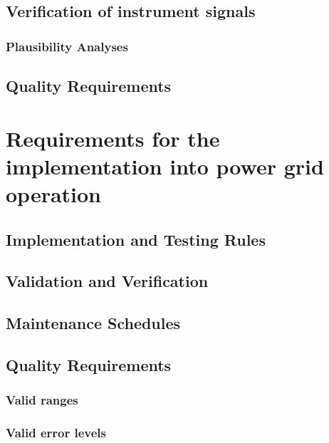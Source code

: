         \subsection{Verification of instrument signals }
    
        \subsubsection{Plausibility Analyses}\label{sec:plausibilityanalaysis}

        \subsection{Quality Requirements }\label{sec:data_quality_instruments} 

\section{Requirements for the implementation into power grid operation {\color{magenta}{Contributing author: COM}}}
    
    \subsection{Implementation and Testing Rules }
    
    \subsection{Validation and Verification }
    
    \subsection{Maintenance Schedules }

    \subsection{Quality Requirements }\label{sec:data_quality_grid}
        \subsubsection{Valid ranges }\label{subsubsec:validranges}
        \subsubsection{Valid error levels }\label{subsubsec:validerrors}
    
